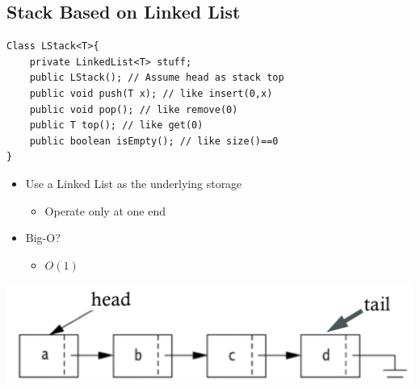\documentclass[10pt]{article}
\begin{document}
\subsection*{Stack Based on Linked List}
\begin{verbatim}
Class LStack<T>{
    private LinkedList<T> stuff;
    public LStack(); // Assume head as stack top
    public void push(T x); // like insert(0,x)
    public void pop(); // like remove(0)
    public T top(); // like get(0)
    public boolean isEmpty(); // like size()==0
}
\end{verbatim}
\begin{itemize}
    \item Use a Linked List as the underlying storage
    \begin{itemize}
        \item Operate only at one end
    \end{itemize}
    \item Big-O?
    \begin{itemize}
        \item $O(1)$
    \end{itemize}
\end{itemize}
\begin{center}
\includegraphics[width=\textwidth/2]{images/4.png}
\end{center}
\end{document}
